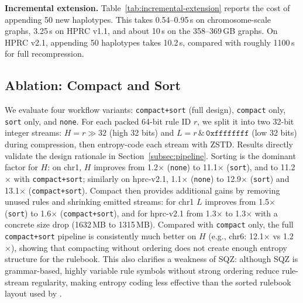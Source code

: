 \noindent \textbf{Incremental extension.}
Table~\ref{tab:incremental-extension} reports the cost of appending 50 new haplotypes. This takes 0.54--0.95\,s on chromosome-scale graphs, 3.25\,s on HPRC v1.1, and about 10\,s on the 358--369\,GB graphs. On HPRC v2.1, appending 50 haplotypes takes 10.2\,s, compared with roughly 1100\,s for full recompression.



\subsection{Ablation: Compact and Sort}\label{subsec:ablation-compact-sort}
We evaluate four workflow variants: \texttt{compact+sort} (full design), \texttt{compact} only, \texttt{sort} only, and \texttt{none}.
For each packed 64-bit rule ID \(r\), we split it into two 32-bit integer streams:
\(H = r \gg 32\) (high 32 bits) and \(L = r \,\&\, \texttt{0xffffffff}\) (low 32 bits) during compression, then entropy-code each stream with ZSTD.
Results directly validate the design rationale in Section~\ref{subsec:pipeline}.
Sorting is the dominant factor for \(H\): on chr1, \(H\) improves from 1.2$\times$ (\texttt{none}) to 11.1$\times$ (\texttt{sort}), and to 11.2$\times$ with \texttt{compact+sort}; similarly on hprc-v2.1, 1.1$\times$ (\texttt{none}) to 12.9$\times$ (\texttt{sort}) and 13.1$\times$ (\texttt{compact+sort}).
Compact then provides additional gains by removing unused rules and shrinking emitted streams: for chr1 \(L\) improves from 1.5$\times$ (\texttt{sort}) to 1.6$\times$ (\texttt{compact+sort}), and for hprc-v2.1 from 1.3$\times$ to 1.3$\times$ with a concrete size drop (1632\,MB to 1315\,MB).
Compared with \texttt{compact} only, the full \texttt{compact+sort} pipeline is consistently much better on \(H\) (e.g., chr6: 12.1$\times$ vs 1.2$\times$), showing that compacting without ordering does not create enough entropy structure for the rulebook.
This also clarifies a weakness of SQZ: although SQZ is grammar-based, highly variable rule symbols without strong ordering reduce rule-stream regularity, making entropy coding less effective than the sorted rulebook layout used by \gfaz.


\begin{table}[t]
  \centering
  \scriptsize
  \setlength{\tabcolsep}{4pt}
  \renewcommand{\arraystretch}{1.05}
  \caption{CPU stage-level profiling for compression and decompression.
    Share is computed as \texttt{time / stage total}.}
  \label{tab:cpu-breakdown}
  \resizebox{\columnwidth}{!}{%
    
  }
\end{table}

